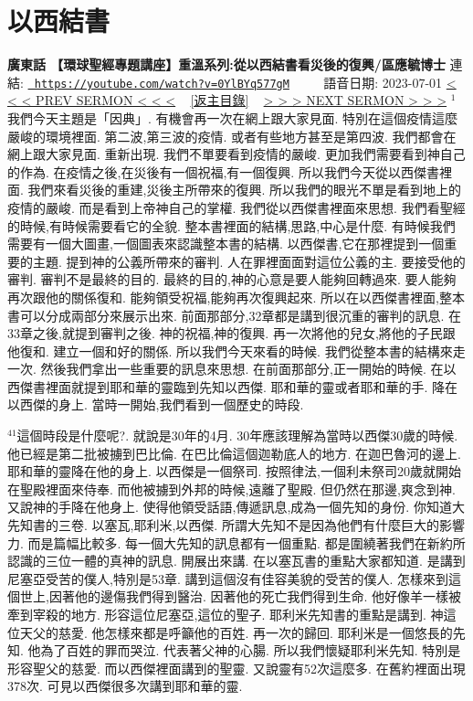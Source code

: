 \documentclass{book}
\begin{document}
\section{以西結書}
\label{sec:0YlBYq577gM}
\textbf{廣東話 【環球聖經專題講座】重溫系列:從以西結書看災後的復興/區應毓博士}
\newline
\newline
連結: \href{https://youtube.com/watch?v=0YlBYq577gM}{\texttt{ https://youtube.com/watch?v=0YlBYq577gM}} ~~~~ 語音日期: 2023-07-01 
\newline
\newline
\hyperref[sec:Fxadxqj_2hA]{\small{< < < PREV SERMON < < <}}
~
\hyperref[sec:index]{\small{[返主目錄]}}
~
\hyperref[sec:m3mUgMGT_bg]{\small{> > > NEXT SERMON > > >}}
\newline
\newline
$^{1}$我們今天主題是「因典」.
有機會再一次在網上跟大家見面.
特別在這個疫情這麼嚴峻的環境裡面.
第二波,第三波的疫情.
或者有些地方甚至是第四波.
我們都會在網上跟大家見面.
重新出現.
我們不單要看到疫情的嚴峻.
更加我們需要看到神自己的作為.
在疫情之後,在災後有一個祝福,有一個復興.
所以我們今天從以西傑書裡面.
我們來看災後的重建,災後主所帶來的復興.
所以我們的眼光不單是看到地上的疫情的嚴峻.
而是看到上帝神自己的掌權.
我們從以西傑書裡面來思想.
我們看聖經的時候,有時候需要看它的全貌.
整本書裡面的結構,思路,中心是什麼.
有時候我們需要有一個大圖畫,一個圖表來認識整本書的結構.
以西傑書,它在那裡提到一個重要的主題.
提到神的公義所帶來的審判.
人在罪裡面面對這位公義的主.
要接受他的審判.
審判不是最終的目的.
最終的目的,神的心意是要人能夠回轉過來.
要人能夠再次跟他的關係復和.
能夠領受祝福,能夠再次復興起來.
所以在以西傑書裡面,整本書可以分成兩部分來展示出來.
前面那部分,32章都是講到很沉重的審判的訊息.
在33章之後,就提到審判之後.
神的祝福,神的復興.
再一次將他的兒女,將他的子民跟他復和.
建立一個和好的關係.
所以我們今天來看的時候.
我們從整本書的結構來走一次.
然後我們拿出一些重要的訊息來思想.
在前面那部分,正一開始的時候.
在以西傑書裡面就提到耶和華的靈臨到先知以西傑.
耶和華的靈或者耶和華的手.
降在以西傑的身上.
當時一開始,我們看到一個歷史的時段.

$^{41}$這個時段是什麼呢?.
就說是30年的4月.
30年應該理解為當時以西傑30歲的時候.
他已經是第二批被擄到巴比倫.
在巴比倫這個迦勒底人的地方.
在迦巴魯河的邊上.
耶和華的靈降在他的身上.
以西傑是一個祭司.
按照律法,一個利未祭司20歲就開始在聖殿裡面來侍奉.
而他被擄到外邦的時候,遠離了聖殿.
但仍然在那邊,爽念到神.
又說神的手降在他身上.
使得他領受話語,傳遞訊息,成為一個先知的身份.
你知道大先知書的三卷.
以塞瓦,耶利米,以西傑.
所謂大先知不是因為他們有什麼巨大的影響力.
而是篇幅比較多.
每一個大先知的訊息都有一個重點.
都是圍繞著我們在新約所認識的三位一體的真神的訊息.
開展出來講.
在以塞瓦書的重點大家都知道.
是講到尼塞亞受苦的僕人,特別是53章.
講到這個沒有佳容美貌的受苦的僕人.
怎樣來到這個世上,因著他的邊傷我們得到醫治.
因著他的死亡我們得到生命.
他好像羊一樣被牽到宰殺的地方.
形容這位尼塞亞,這位的聖子.
耶利米先知書的重點是講到.
神這位天父的慈愛.
他怎樣來都是呼籲他的百姓.
再一次的歸回.
耶利米是一個悠長的先知.
他為了百姓的罪而哭泣.
代表著父神的心腸.
所以我們懷疑耶利米先知.
特別是形容聖父的慈愛.
而以西傑裡面講到的聖靈.
又說靈有52次這麼多.
在舊約裡面出現378次.
可見以西傑很多次講到耶和華的靈.
\end{document}
